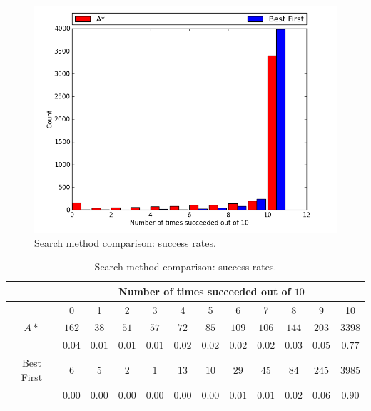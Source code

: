 \begin{figure}[H]
\begin{center}
\includegraphics[width=\textwidth]{Images/search_success_comparison.png}
\caption{Search method comparison: success rates.}
\label{fig:search_success}
\end{center}
\end{figure}

\begin{table}[H]
\begin{center}
\begin{singlespace}
\begin{tabular}{|c||c|c|c|c|c|c|c|c|c|c|c|}
\hline
 & \multicolumn{11}{|c|}{Number of times succeeded out of $10$} \\
\hline
 & 0 & 1 & 2 & 3 & 4 & 5 & 6 & 7 & 8 & 9 & 10 \\
\hline\hline
$A*$ & $162$ & $38$ & $51$ & $57$ & $72$ & $85$ & $109$ & $106$ & $144$ & $203$ & $3398$ \\
 & $0.04$ & $0.01$ & $0.01$ & $0.01$ & $0.02$ & $0.02$ & $0.02$ & $0.02$ & $0.03$ & $0.05$ & $0.77$ \\
\hline
 Best First & $6$ & $5$ & $2$ & $1$ & $13$ & $10$ & $29$ & $45$ & $84$ & $245$ & $3985$ \\
  & $0.00$ & $0.00$ & $0.00$ & $0.00$ & $0.00$ & $0.00$ & $0.01$ & $0.01$ & $0.02$ & $0.06$ & $0.90$ \\
\hline
\end{tabular}
\end{singlespace}
\end{center}
\label{tb:search_success}
\caption{Search method comparison: success rates.}
\end{table}

